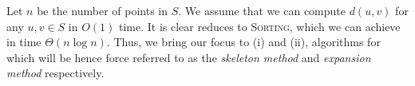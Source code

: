 Let $n$ be the number of points in $S$. We assume that we can compute $d(u,v)$ for any $u, v \in S$ in $O(1)$ time. It is clear  reduces to \textsc{Sorting}, which we can achieve in time $\Theta(n\log n)$. Thus, we bring our focus to (i) and (ii), algorithms for which will be hence force referred to as the \emph{skeleton method} and \emph{expansion method} respectively.



